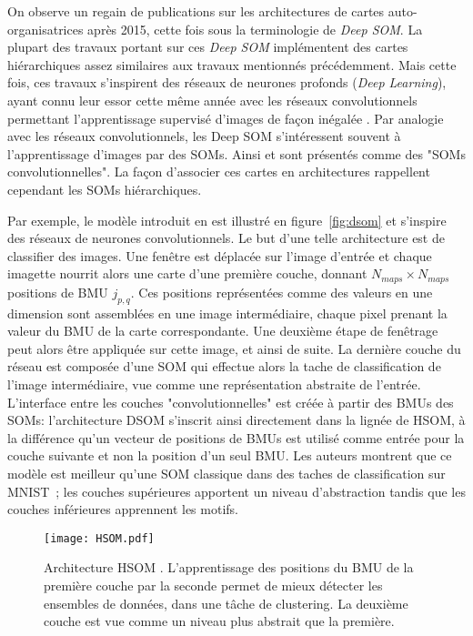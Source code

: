 \documentclass[../main]{subfiles}
\begin{document}
On observe un regain de publications sur les architectures de cartes auto-organisatrices après 2015, cette fois sous la terminologie de \emph{Deep SOM}.
La plupart des travaux portant sur ces \emph{Deep SOM} implémentent des cartes hiérarchiques assez similaires aux travaux mentionnés précédemment. 
Mais cette fois, ces travaux s'inspirent des réseaux de neurones profonds (\emph{Deep Learning}), ayant connu leur essor cette même année avec les réseaux convolutionnels permettant l'apprentissage supervisé d'images de façon inégalée \cite{lecun_deep_2015}.
Par analogie avec les réseaux convolutionnels, les Deep SOM s'intéressent souvent à l'apprentissage d'images par des SOMs. Ainsi \cite{Liu2015DeepSM,hankins_somnet_2018,wickramasinghe_deep_2019,aly_deep_2020,sakkari_convolutional_2020,dozono_convolutional_2016,nawaratne_hierarchical_2020-1,mici_self-organizing_2018} et sont présentés comme des "SOMs convolutionnelles". La façon d'associer ces cartes en architectures rappellent cependant les SOMs hiérarchiques.

Par exemple, le modèle introduit en \cite{Liu2015DeepSM} est illustré en figure~\ref{fig:dsom} et s'inspire des réseaux de neurones convolutionnels.
Le but d'une telle architecture est de classifier des images. Une fenêtre est déplacée sur l'image d'entrée et chaque imagette nourrit alors une carte d'une première couche, donnant $N_{maps}  \times N_{maps}$ positions de BMU $j_{p,q}$. Ces positions représentées comme des valeurs en une dimension sont assemblées en une image intermédiaire, chaque pixel prenant la valeur du BMU de la carte correspondante. Une deuxième étape de fenêtrage peut alors être appliquée sur cette image, et ainsi de suite. La dernière couche du réseau est composée d'une SOM qui effectue alors la tache de classification de l'image intermédiaire, vue comme une représentation abstraite  de l'entrée.
L'interface entre les couches "convolutionnelles" est créée à partir des BMUs des SOMs: l'architecture DSOM s'inscrit ainsi directement dans la lignée de HSOM, à la différence qu'un vecteur de positions de BMUs est utilisé comme entrée pour la couche suivante et non la position d'un seul BMU.
Les auteurs montrent que ce modèle est meilleur qu'une SOM classique dans des taches de classification sur MNIST~; les couches supérieures apportent un niveau d'abstraction tandis que les couches inférieures apprennent les motifs.

\begin{figure}
    \centering
    \texttt{[image: HSOM.pdf]}
    \caption{Architecture HSOM \cite{lampinen_clustering_1992}. L'apprentissage des positions du BMU de la première couche par la seconde permet de mieux détecter les ensembles de données, dans une tâche de clustering. La deuxième couche est vue comme un niveau plus abstrait que la première. \label{fig:hsom}}
\end{figure}
\end{document}
